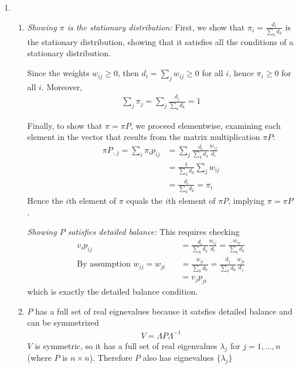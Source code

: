 \documentclass[12pt]{article}
\theoremstyle{plain}
\theoremstyle{definition}
\theoremstyle{remark}
\begin{document}
\begin{enumerate}
\item %
  \begin{enumerate}
    \item %
      {\sl Showing $\pi$ is the stationary distribution:} First, we show that
      $\pi_i = \frac{d_i}{\sum_k d_k}$ is the stationary distribution, showing
      that it satisfies all the conditions of a stationary distribution. 
      
      Since the weights $w_{ij}\geq 0$, then $d_i = \sum_j w_{ij}\geq 0$ for
      all $i$, hence $\pi_i\geq 0$ for all $i$. Moreover, 
      \begin{align*}
        \sum_j \pi_j = \sum_j \frac{d_j}{\sum_k d_k} = 1
      \end{align*}

      Finally, to show that $\pi = \pi P$, we proceed elementwise, examining
      each element in the vector that results from the matrix multiplication
      $\pi P$:
      \begin{align*}
        \pi P_{\cdot,j} 
          = \sum_i \pi_i p_{ij} 
          &= \sum_j \frac{d_i}{\sum_k d_k} \frac{w_{ij}}{d_i}\\
          &= \frac{1}{\sum_k d_k} \sum_j w_{ij}\\
          &= \frac{d_i}{\sum_k d_k} = \pi_i
      \end{align*}
      Hence the $i$th element of $\pi$ equals the $i$th element of $\pi P$,
      implying $\pi=\pi P$.

      {\sl Showing $P$ satisfies detailed balance:} This requires checking
      \begin{align*}
        v_i p_{ij} &= \frac{d_i}{\sum_k d_k} \frac{w_{ij}}{d_i}  
        = \frac{w_{ij}}{\sum_k d_k}  \\
        \text{By assumption $w_{ij}=w_{ji}$} \quad &= \frac{w_{ji}}{\sum_k d_k}  
         = \frac{d_j}{\sum_k d_k} \frac{w_{ji}}{d_j}  \\
         &= v_j p_{ji}
      \end{align*}
      which is exactly the detailed balance condition.

    \item %
      $P$ has a full set of real eignevalues because it satsfies detailed
      balance and can be symmetrized 
      \begin{align*}
        V = \Lambda P \Lambda^{-1}
      \end{align*}
      $V$ is symmetric, so it has a full set of real eigenvalues $\lambda_j$
      for $j=1,\ldots,n$ (where $P$ is $n\times n$). Therefore $P$ also has
      eignevalues $\{\lambda_j\}$


\end{enumerate}
\end{enumerate}
\end{document}
